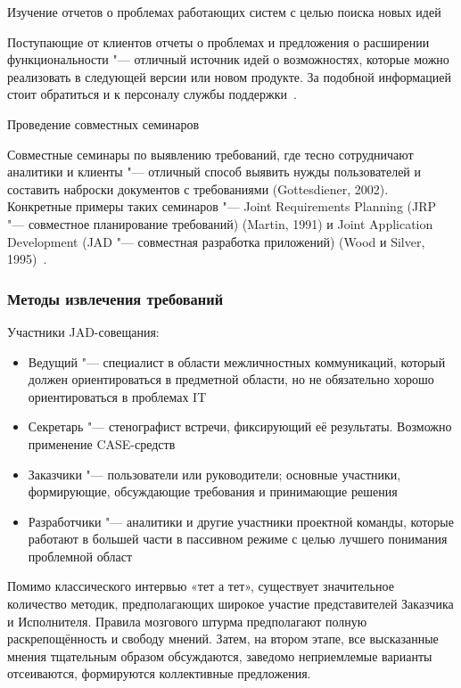 \documentclass{../industrial-development}
\begin{document}
\alert{Изучение отчетов о проблемах работающих систем с целью поиска новых идей}

Поступающие от клиентов отчеты о проблемах и предложения о расширении функциональности "--- отличный источник идей о возможностях, которые можно реализовать в следующей версии или новом продукте. За подобной информацией стоит обратиться и к персоналу службы поддержки~\cite[с.~48]{Wiegers}.

\alert{Проведение совместных семинаров}

Совместные семинары по выявлению требований, где тесно сотрудничают аналитики и клиенты "--- отличный способ выявить нужды пользователей и составить наброски документов с требованиями (Gottesdiener, 2002). Конкретные примеры таких семинаров "--- Joint Requirements Planning (JRP "--- совместное планирование требований) (Martin, 1991) и Joint Application Development (JAD "--- совместная разработка приложений) (Wood и Silver, 1995)~\cite[с.~47]{Wiegers}.


\begin{frame} \frametitle{Методы извлечения требований}
Участники JAD-совещания:
  \begin{itemize} 
\item \alert{Ведущий} "--- специалист в области межличностных коммуникаций, который должен
ориентироваться в предметной области, но не обязательно хорошо ориентироваться в
проблемах IT
\item \alert{Секретарь} "--- стенографист встречи, фиксирующий её результаты. Возможно применение CASE-средств
\item \alert{Заказчики} "--- пользователи или руководители; основные участники, формирующие,
обсуждающие требования и принимающие решения
\item \alert{Разработчики} "--- аналитики и другие участники проектной команды, которые работают в
большей части в пассивном режиме с целью лучшего понимания проблемной област
\end{itemize}
\end{frame}

\lecturenotes

Помимо классического интервью «тет а тет», существует значительное количество методик, предполагающих широкое участие представителей Заказчика и Исполнителя. Правила мозгового штурма предполагают полную раскрепощённость и свободу мнений.  Затем, на втором этапе, все высказанные мнения тщательным образом обсуждаются, заведомо неприемлемые варианты отсеиваются, формируются коллективные предложения.
\end{document}
